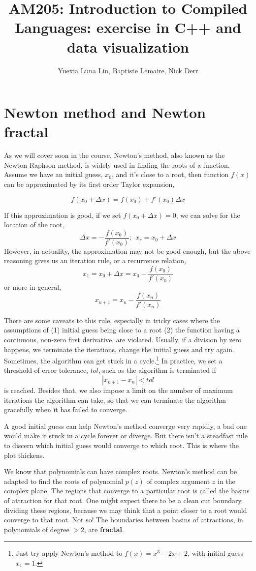 \documentclass{article}
\title{AM205: Introduction to Compiled Languages: exercise in C++ and data visualization}
\author{Yuexia Luna Lin, Baptiste Lemaire, Nick Derr}
\begin{document}
\maketitle

\section*{Newton method and Newton fractal}
As we will cover soon in the course, Newton's method, also known as the Newton-Raphson method, is widely used in finding the roots of a function.
Assume we have an initial guess, $x_0$, and it's close to a root, then function $f(x)$ can be approximated by its first order Taylor expansion,

$$
	f(x_0 + \Delta x) = f(x_0) + f'(x_0) \Delta x
$$

If this approximation is good, if we set $f(x_0 + \Delta x) = 0$, we can solve for the location of the root, 
$$
   \Delta x = -\frac{f(x_0)}{f'(x_0)}; ~~x_r = x_0 + \Delta x
$$
However, in actuality, the approximation may not be good enough, but the above reasoning
gives us an iteration rule, or a recurrence relation,
$$
x_1 = x_0 + \Delta x = x_0 - \frac{f(x_0)}{f'(x_0)}
$$
or more in general,
$$
x_{n+1} = x_n  -\frac{f(x_n)}{f'(x_n)}
$$

There are some caveats to this rule, especially in tricky cases where the assumptions of (1) initial guess being close to a root (2) the function having a continuous, non-zero first derivative, are violated.
Usually, if a division by zero happens, we terminate the iterations, change the initial guess and try again. Sometimes, the algorithm can get stuck in a cycle.\footnote{Just try apply Newton's method to $f(x) = x^3 - 2x + 2$, with initial guess $x_1 = 1$.}
In practice, we set a threshold of error tolerance, $tol$, such as the algorithm is
terminated if 
\begin{equation}
| x_{n+1} - x_{n} | < tol
\label{eq:thres}
\end{equation}
 is reached. Besides that, we also impose a limit on the number of maximum iterations the algorithm can take,
so that we can terminate the algorithm gracefully when it has failed to converge. 

A good initial guess can help Newton's method converge very rapidly, a bad one would make it stuck in a cycle forever or diverge.
But there isn't a steadfast rule to discern which initial guess would converge to which root. This is where the plot thickens.

We know that polynomials can have complex roots. 
Newton's method can be adapted to find the roots of polynomial $p(z)$ of complex argument $z$ in the complex plane.
The regions that converge to a particular root is called the basins of attraction for that root. 
One might expect there to be a clean cut boundary dividing these regions, because we
may think that a point closer to a root would converge to that root. Not so!
The boundaries between basins of attractions, in polynomials of degree $>2$, are \textbf{fractal}.
\end{document}
